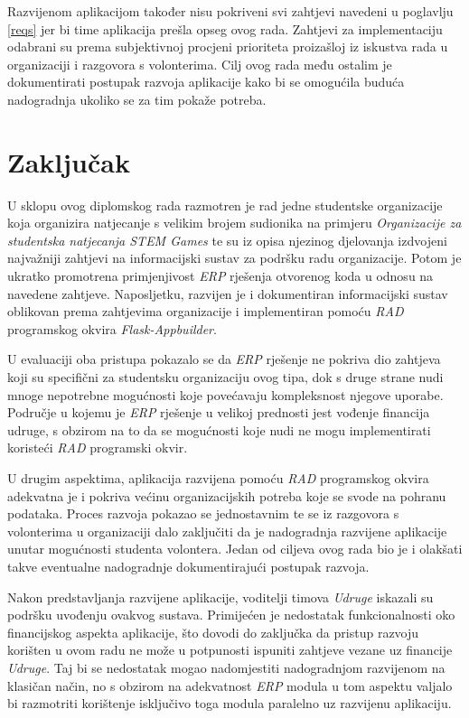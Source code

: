 \documentclass[times, utf8, diplomski]{fer}
\begin{document}
Razvijenom aplikacijom također nisu pokriveni svi zahtjevi navedeni u poglavlju
\ref{reqs} jer bi time aplikacija prešla opseg ovog rada. Zahtjevi za
implementaciju odabrani su prema subjektivnoj procjeni prioriteta proizašloj iz
iskustva rada u organizaciji i razgovora s volonterima. Cilj ovog rada među
ostalim je dokumentirati postupak razvoja aplikacije kako bi se omogućila
buduća nadogradnja ukoliko se za tim pokaže potreba.

\chapter{Zaključak}

U sklopu ovog diplomskog rada razmotren je rad jedne studentske organizacije
koja organizira natjecanje s velikim brojem sudionika na primjeru
\emph{Organizacije za studentska natjecanja STEM Games} te su iz opisa njezinog
djelovanja izdvojeni najvažniji zahtjevi na informacijski sustav za podršku radu
organizacije. Potom je ukratko promotrena primjenjivost \emph{ERP} rješenja
otvorenog koda u odnosu na navedene zahtjeve. Naposljetku, razvijen je i
dokumentiran informacijski sustav oblikovan prema zahtjevima organizacije i
implementiran pomoću \emph{RAD} programskog okvira \emph{Flask-Appbuilder}.

U evaluaciji oba pristupa pokazalo se da \emph{ERP} rješenje ne pokriva dio
zahtjeva koji su specifični za studentsku organizaciju ovog tipa, dok s druge
strane nudi mnoge nepotrebne mogućnosti koje povećavaju kompleksnost njegove
uporabe. Područje u kojemu je \emph{ERP} rješenje u velikoj prednosti jest
vođenje financija udruge, s obzirom na to da se mogućnosti koje nudi ne mogu
implementirati koristeći \emph{RAD} programski okvir.

U drugim aspektima, aplikacija razvijena pomoću \emph{RAD} programskog okvira
adekvatna je i pokriva većinu organizacijskih potreba koje se svode na pohranu
podataka. Proces razvoja pokazao se jednostavnim te se iz razgovora s
volonterima u organizaciji dalo zaključiti da je nadogradnja razvijene
aplikacije unutar mogućnosti studenta volontera. Jedan od ciljeva ovog rada bio
je i olakšati takve eventualne nadogradnje dokumentirajući postupak razvoja.

Nakon predstavljanja razvijene aplikacije, voditelji timova \emph{Udruge}
iskazali su podršku uvođenju ovakvog sustava. Primijećen je nedostatak
funkcionalnosti oko financijskog aspekta aplikacije, što dovodi do zaključka da
pristup razvoju korišten u ovom radu ne može u potpunosti ispuniti zahtjeve
vezane uz financije \emph{Udruge}. Taj bi se nedostatak mogao nadomjestiti
nadogradnjom razvijenom na klasičan način, no s obzirom na adekvatnost
\emph{ERP} modula u tom aspektu valjalo bi razmotriti korištenje isključivo toga
modula paralelno uz razvijenu aplikaciju.
\end{document}
